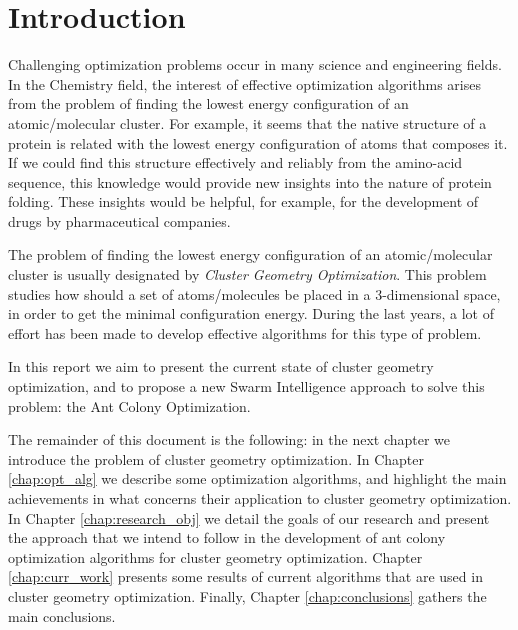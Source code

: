\chapter{Introduction}
Challenging optimization problems occur in many science and engineering fields. In the Chemistry field, the interest of effective optimization algorithms arises from the problem of finding the lowest energy configuration of an atomic/molecular cluster. For example, it seems that the native structure of a protein is related with the lowest energy configuration of atoms that composes it\cite{wales97}. If we could find this structure effectively and reliably from the amino-acid sequence, this knowledge would provide new insights into the nature of protein folding. These insights would be helpful, for example, for the development of drugs by pharmaceutical companies.

The problem of finding the lowest energy configuration of an atomic/molecular cluster is usually designated by \emph{Cluster Geometry Optimization}. This problem studies how should a set of atoms/molecules be placed in a 3-dimensional space, in order to get the minimal configuration energy. During the last years, a lot of effort has been made to develop effective algorithms for this type of problem.

In this report we aim to present the current state of cluster geometry optimization, and to propose a new Swarm Intelligence approach to solve this problem: the Ant Colony Optimization.

The remainder of this document is the following: in the next chapter we introduce the problem of cluster geometry optimization. In Chapter \ref{chap:opt_alg} we describe some optimization algorithms, and highlight the main achievements in what concerns their application to cluster geometry optimization. In Chapter \ref{chap:research_obj} we detail the goals of our research and present the approach that we intend to follow in the development of ant colony optimization algorithms for cluster geometry optimization. Chapter \ref{chap:curr_work} presents some results of current algorithms that are used in cluster geometry optimization. Finally, Chapter \ref{chap:conclusions} gathers the main conclusions.



